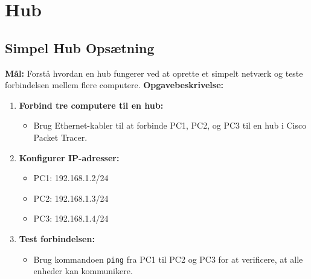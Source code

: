 \section{Hub}
\subsection{Simpel Hub Opsætning}
\textbf{Mål:} Forstå hvordan en hub fungerer ved at oprette et simpelt netværk og teste forbindelsen mellem flere computere.
\newline\newline\noindent
\textbf{Opgavebeskrivelse:}
\begin{enumerate}
	\item \textbf{Forbind tre computere til en hub:}
	\begin{itemize}
		\item Brug Ethernet-kabler til at forbinde PC1, PC2, og PC3 til en hub i Cisco Packet Tracer.
	\end{itemize}
	\item \textbf{Konfigurer IP-adresser:}
	\begin{itemize}
		\item PC1: 192.168.1.2/24
		\item PC2: 192.168.1.3/24
		\item PC3: 192.168.1.4/24
	\end{itemize}
	\item \textbf{Test forbindelsen:}
	\begin{itemize}
		\item Brug kommandoen \texttt{ping} fra PC1 til PC2 og PC3 for at verificere, at alle enheder kan kommunikere.
	\end{itemize}
\end{enumerate}


